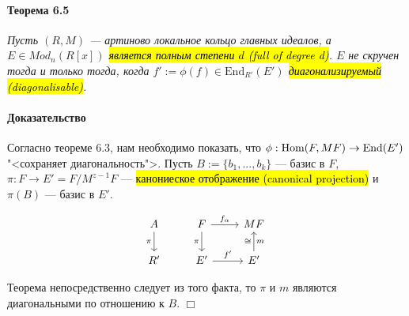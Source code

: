 \documentclass[a4paper,12pt]{article}
\newcommand{\Endom}{\text{End}}
\begin{document}
\paragraph{Теорема 6.5}
{\itshape
Пусть $(R,M )$ --- артиново локальное кольцо главных идеалов, а $E \in Mod_n(R[x])$ \hl{является полным степени $d$ (full of degree d)}. $E$ не скручен тогда и только тогда, когда $f' := \phi (f) \in \Endom_{R'}(E')$ \hl{диагонализируемый (diagonalisable)}.
}

\paragraph{Доказательство}
Согласно теореме 6.3, нам необходимо показать, что $\phi: \Hom(F,MF) \rightarrow \Endom(E')$ "<сохраняет диагональность">. Пусть $B:=\{b_1, ..., b_k\}$ --- базис в $F$, $\pi : F \rightarrow E' = F/M^{z-1}F$ --- \hl{канониеское отображение (canonical projection)} и $\pi(B)$ --- базис в $E'$.

$$
\begin{tikzcd}
	A \dar[']{\pi} & F \dar[']{\pi} \rar{f_\alpha} & MF \\
	R' & E' \rar{f'} & E' \uar{\cong}[']{m}
\end{tikzcd}
$$

Теорема непосредственно следует из того факта, то $\pi$ и $m$ являются диагональными по отношению к $B$. $\Box$
\end{document}
